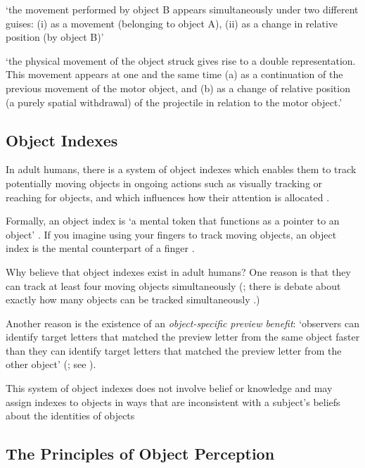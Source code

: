 \documentclass[12pt]{extarticle}
\begin{document}
\begin{multicols*}{3}
‘the movement performed by object B appears simultaneously under two
different guises: (i) as a movement (belonging to object A), (ii) as a
change in relative position (by object B)’
\citep[p.~136]{Michotte:1946nz}

‘the physical movement of the object struck gives rise to a double
representation. This movement appears at one and the same time (a) as a
continuation of the previous movement of the motor object, and (b) as a
change of relative position (a purely spatial withdrawal) of the projectile
in relation to the motor object.’
\citep[p.~140]{Michotte:1946nz}

\subsection{Object Indexes}
In adult humans,
there is a system of object indexes which enables them to track potentially moving objects in ongoing actions such as visually tracking or
reaching for objects, and which influences how their attention is allocated
\citep{flombaum:2008_attentional}.

Formally, an object index is ‘a mental token that functions as a
pointer to an object’ \citep[p.\ 11]{Leslie:1998zk}.
If you imagine using your fingers to track moving objects,
an object index is the mental counterpart of a finger \citep[p.~68]{pylyshyn:1989_role}.

Why believe that object indexes exist in adult humans?
One reason is that they can track at least four moving objects simultaneously
(\citealp{pylyshyn:1988_tracking}; there is debate about exactly how many objects can be tracked simultaneously \citep{alvarez:2007_how}.)

Another reason is the existence of an  \emph{object-specific preview benefit}: ‘observers can identify target
letters that matched the preview letter from the same object faster than
they can identify target letters that matched the preview letter from the
other object’ (\citealp[p.~2]{Krushke:1996ge}; see \citealp{Kahneman:1992xt}).

This system of object indexes
does not involve belief or knowledge
and may assign indexes to objects in ways that are inconsistent with
a subject’s beliefs about the identities of objects
\citep[e.g.][]{Mitroff:2004pc, mitroff:2007_space}


\subsection{The Principles of Object Perception}
 

\end{multicols*}
\end{document}
